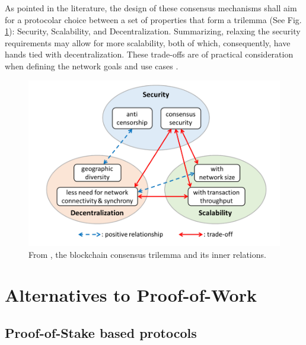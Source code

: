 \documentclass[journal]{IEEEtran}
\begin{document}
As pointed in the literature, the design of these consensus mechanisms
shall aim for a protocolar choice between a set of properties that form a trilemma (See Fig. \ref{fig:trilemma}): 
Security, Scalability, and Decentralization.
Summarizing, relaxing the security requirements may allow for more scalability, both of which,
consequently, have hands tied with decentralization. These trade-offs are of practical
consideration when defining the network goals and use cases \cite{survey-dist-consensus}.

\begin{figure}[h]
  \centering
  \includegraphics[width=\columnwidth]{trilemma}
  \caption{From \cite{survey-dist-consensus}, the blockchain consensus trilemma and its inner relations.}
  \label{fig:trilemma}
\end{figure}

\section{Alternatives to Proof-of-Work}

\subsection{Proof-of-Stake based protocols}
\end{document}
